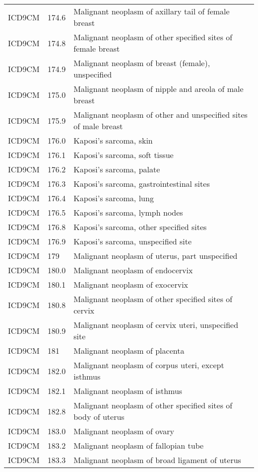 \begin{longtable}{p{}p{}p{}}
  ICD9CM & 174.6 & Malignant neoplasm of axillary tail of female breast \\ 
  ICD9CM & 174.8 & Malignant neoplasm of other specified sites of female breast \\ 
  ICD9CM & 174.9 & Malignant neoplasm of breast (female), unspecified \\ 
  ICD9CM & 175.0 & Malignant neoplasm of nipple and areola of male breast \\ 
  ICD9CM & 175.9 & Malignant neoplasm of other and unspecified sites of male breast \\ 
  ICD9CM & 176.0 & Kaposi's sarcoma, skin \\ 
  ICD9CM & 176.1 & Kaposi's sarcoma, soft tissue \\ 
  ICD9CM & 176.2 & Kaposi's sarcoma, palate \\ 
  ICD9CM & 176.3 & Kaposi's sarcoma, gastrointestinal sites \\ 
  ICD9CM & 176.4 & Kaposi's sarcoma, lung \\ 
  ICD9CM & 176.5 & Kaposi's sarcoma, lymph nodes \\ 
  ICD9CM & 176.8 & Kaposi's sarcoma, other specified sites \\ 
  ICD9CM & 176.9 & Kaposi's sarcoma, unspecified site \\ 
  ICD9CM & 179 & Malignant neoplasm of uterus, part unspecified \\ 
  ICD9CM & 180.0 & Malignant neoplasm of endocervix \\ 
  ICD9CM & 180.1 & Malignant neoplasm of exocervix \\ 
  ICD9CM & 180.8 & Malignant neoplasm of other specified sites of cervix \\ 
  ICD9CM & 180.9 & Malignant neoplasm of cervix uteri, unspecified site \\ 
  ICD9CM & 181 & Malignant neoplasm of placenta \\ 
  ICD9CM & 182.0 & Malignant neoplasm of corpus uteri, except isthmus \\ 
  ICD9CM & 182.1 & Malignant neoplasm of isthmus \\ 
  ICD9CM & 182.8 & Malignant neoplasm of other specified sites of body of uterus \\ 
  ICD9CM & 183.0 & Malignant neoplasm of ovary \\ 
  ICD9CM & 183.2 & Malignant neoplasm of fallopian tube \\ 
  ICD9CM & 183.3 & Malignant neoplasm of broad ligament of uterus \\ 

\end{longtable}
